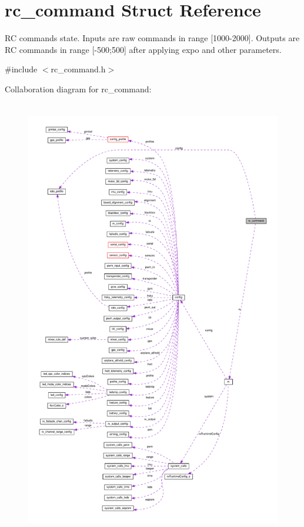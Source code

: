 \hypertarget{structrc__command}{\section{rc\+\_\+command Struct Reference}
\label{structrc__command}
}


R\+C commands state. Inputs are raw commands in range \mbox{[}1000-\/2000\mbox{]}. Outputs are R\+C commands in range \mbox{[}-\/500;500\mbox{]} after applying expo and other parameters.  




{\ttfamily \#include $<$rc\+\_\+command.\+h$>$}



Collaboration diagram for rc\+\_\+command\+:\nopagebreak
\begin{figure}[H]
\begin{center}
\leavevmode
\includegraphics[height=550pt]{structrc__command__coll__graph}
\end{center}
\end{figure}
